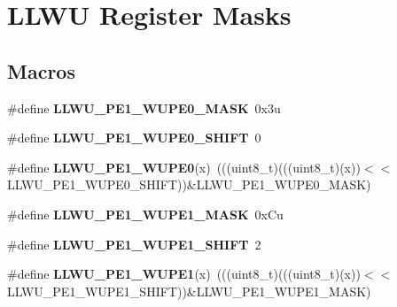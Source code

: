 \hypertarget{group___l_l_w_u___register___masks}{}\section{L\+L\+WU Register Masks}
\label{group___l_l_w_u___register___masks}
\subsection*{Macros}
\begin{DoxyCompactItemize}
\item 
\mbox{\label{group___l_l_w_u___register___masks_ga6ed6c56a8797caa64d27eb915c164dad}} 
\#define {\bfseries L\+L\+W\+U\+\_\+\+P\+E1\+\_\+\+W\+U\+P\+E0\+\_\+\+M\+A\+SK}~0x3u
\item 
\mbox{\label{group___l_l_w_u___register___masks_ga234c02ee9c2b3e3e248c90473e922336}} 
\#define {\bfseries L\+L\+W\+U\+\_\+\+P\+E1\+\_\+\+W\+U\+P\+E0\+\_\+\+S\+H\+I\+FT}~0
\item 
\mbox{\label{group___l_l_w_u___register___masks_ga61f1d3c27404e82bdebb9627e83f35dd}} 
\#define {\bfseries L\+L\+W\+U\+\_\+\+P\+E1\+\_\+\+W\+U\+P\+E0}(x)~(((uint8\+\_\+t)(((uint8\+\_\+t)(x))$<$$<$L\+L\+W\+U\+\_\+\+P\+E1\+\_\+\+W\+U\+P\+E0\+\_\+\+S\+H\+I\+FT))\&L\+L\+W\+U\+\_\+\+P\+E1\+\_\+\+W\+U\+P\+E0\+\_\+\+M\+A\+SK)
\item 
\mbox{\label{group___l_l_w_u___register___masks_gac0c417f78992f2ebaca7267ef06d888a}} 
\#define {\bfseries L\+L\+W\+U\+\_\+\+P\+E1\+\_\+\+W\+U\+P\+E1\+\_\+\+M\+A\+SK}~0x\+Cu
\item 
\mbox{\label{group___l_l_w_u___register___masks_gaa9b8224f389f9c3d4f13772d8e5fbeee}} 
\#define {\bfseries L\+L\+W\+U\+\_\+\+P\+E1\+\_\+\+W\+U\+P\+E1\+\_\+\+S\+H\+I\+FT}~2
\item 
\mbox{\label{group___l_l_w_u___register___masks_gab35a751adac37592806af18a4f6e3837}} 
\#define {\bfseries L\+L\+W\+U\+\_\+\+P\+E1\+\_\+\+W\+U\+P\+E1}(x)~(((uint8\+\_\+t)(((uint8\+\_\+t)(x))$<$$<$L\+L\+W\+U\+\_\+\+P\+E1\+\_\+\+W\+U\+P\+E1\+\_\+\+S\+H\+I\+FT))\&L\+L\+W\+U\+\_\+\+P\+E1\+\_\+\+W\+U\+P\+E1\+\_\+\+M\+A\+SK)

\end{DoxyCompactItemize}
